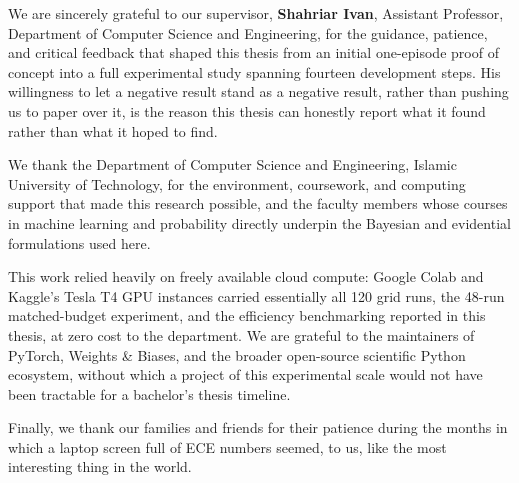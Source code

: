 \documentclass{iutbscthesis}
\begin{document}
\begin{acknowledgement}

We are sincerely grateful to our supervisor, \textbf{Shahriar Ivan}, Assistant Professor, Department of Computer Science and Engineering, for the guidance, patience, and critical feedback that shaped this thesis from an initial one-episode proof of concept into a full experimental study spanning fourteen development steps. His willingness to let a negative result stand as a negative result, rather than pushing us to paper over it, is the reason this thesis can honestly report what it found rather than what it hoped to find.

We thank the Department of Computer Science and Engineering, Islamic University of Technology, for the environment, coursework, and computing support that made this research possible, and the faculty members whose courses in machine learning and probability directly underpin the Bayesian and evidential formulations used here.

This work relied heavily on freely available cloud compute: Google Colab and Kaggle's Tesla T4 GPU instances carried essentially all 120 grid runs, the 48-run matched-budget experiment, and the efficiency benchmarking reported in this thesis, at zero cost to the department. We are grateful to the maintainers of PyTorch, Weights \& Biases, and the broader open-source scientific Python ecosystem, without which a project of this experimental scale would not have been tractable for a bachelor's thesis timeline.

Finally, we thank our families and friends for their patience during the months in which a laptop screen full of ECE numbers seemed, to us, like the most interesting thing in the world.

\end{acknowledgement}
\end{document}
